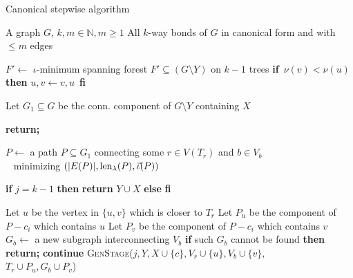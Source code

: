 \begin{algorithm}
	\caption{Canonical stepwise algorithm}
	\label{alg:final}
\begin{algorithmic}[1]
	\Require A graph $G$, $k,m \in \mathbb{N}, m \geq 1$
	\Ensure All $k$-way bonds of $G$ in canonical form and with $\leq m$ edges

	\State {}
	\State $F' \leftarrow$ $\iota$-minimum spanning forest $F' \subseteq (G \setminus Y )$ on $k-1$ trees
		\State \textbf{if} $ \, \nu(v) < \nu(u)$ \textbf{then}  $u,v \leftarrow v, u \,$ \textbf{fi}
		\State {}
	\EndFor
	\EndProcedure


	\State Let $G_1 \subseteq G$ be the conn. component of $G \setminus Y$ containing $X$

		\State \textbf{return;}
	\EndIf

	\State $P \leftarrow$ a path $P \subseteq G_1$ connecting some $r \in V(T_r)$ and $b \in V_b$ \\
	\qquad \quad \,\,\, minimizing $(\lvert E(P) \rvert, \operatorname{len}_\lambda(P), \vec{\iota}(P) )$

		\State \textbf{if} $j = k - 1$ \textbf{then} \textbf{return} $Y \cup X$ 
		\State \textbf{else}  \textbf{fi}

	\Else
			\State Let $u$ be the vertex in $\{u,v\}$ which is closer to $T_r$
			\State Let $P_u$ be the component of $P - c_i$ which contains $u$
			\State Let $P_v$ be the component of $P - c_i$ which contains $v$
				\State $G_b \leftarrow$ a new subgraph interconnecting $V_b$
				\State \textbf{if} such $G_b$ cannot be found \textbf{then} \textbf{return;}
			\EndIf
				\State \textbf{continue}
			\EndIf
			\State \textsc{GenStage}($j, Y, X \cup \{c\}, V_r \cup \{u\}, V_b \cup \{v\},$ \\
			\hskip 116.8pt $T_r \cup P_u, G_b \cup P_v$)
		\EndFor
	\EndIf

	\EndProcedure
\end{algorithmic}
\end{algorithm}

